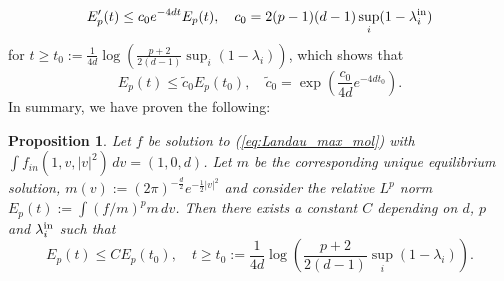 \documentclass[11pt]{amsart}
\numberwithin{equation}{section}
\newtheorem{proposition}{Proposition}
\begin{document}
\[
E_{p}'(t)\leq c_{0}e^{-4dt}E_{p}(t),\quad c_{0}=2(p-1)(d-1)\sup_{i}(1-\lambda_{i}^{\textnormal{in}})
\]
for $t\geq t_{0}:=\frac{1}{4d}\log\left(\frac{p+2}{2(d-1)}\sup_i(1-\lambda_i)\right)$, which shows that 
\begin{equation*}
  E_{p}(t)\leq\tilde{c}_{0}E_{p}(t_{0}),\quad \tilde{c}_{0}=\exp\left(\frac{c_{0}}{4d}e^{-4dt_{0}}\right).
\end{equation*}
In summary, we have proven the following:
% 
\begin{proposition}\label{prop:bounded_rel_Lp}
 Let $f$ be solution to (\ref{eq:Landau_max_mol}) with  $\int f_{in}(1,v,|v|^2)\,dv =(1,0,d)$.  Let $m$ be the corresponding unique equilibrium solution, $m(v) :=(2\pi)^{-\frac{d}{2}}e^{-\frac{1}{2}\vert{v}\vert^{2}}$ and consider the relative $L^p$ norm $E_p(t):=\int (f/m)^pm\,dv$. Then there exists a constant $C$ depending on $d$, $p$ and $\lambda_i^\textnormal{in}$ such that
  \begin{equation*}
    E_{p}(t)\leq C E_{p}(t_{0}),\quad t\geq t_{0}:=\frac{1}{4d}\log\left(\frac{p+2}{2(d-1)}\sup_i(1-\lambda_i)\right).
  \end{equation*}
\end{proposition}
% 


\end{document}
